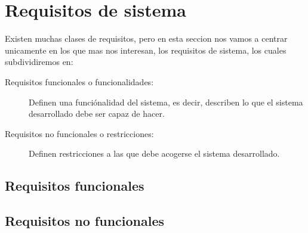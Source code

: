 \chapter{Requisitos de sistema}

    Existen muchas clases de requisitos, pero en esta seccion nos vamos a centrar unicamente en los que mas nos interesan, los requisitos de sistema, los cuales subdividiremos en:
    \begin{description}
        \item[Requisitos funcionales o funcionalidades:]
            Definen una funciónalidad del sistema, es decir, describen lo que el sistema desarrollado debe ser capaz de hacer.
        \item[Requisitos no funcionales o restricciones:]
            Definen restricciones a las que debe acogerse el sistema desarrollado.
  
    \end{description}
  

\section{Requisitos funcionales}
    

\section{Requisitos no funcionales}
    

%    
